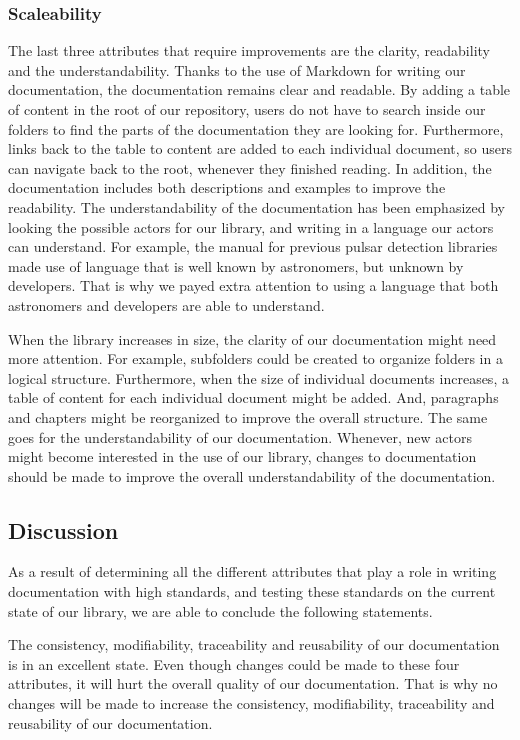 \documentclass{article}
\begin{document}
    \subsubsection{Scaleability}

    The last three attributes that require improvements are the clarity, readability and the understandability. Thanks to the use of Markdown for writing our documentation, the
    documentation remains clear and readable. By adding a table of content in the root of our repository, users do not have to search inside our folders to find the parts of the
    documentation they are looking for. Furthermore, links back to the table to content are added to each individual document, so users can navigate back to the root, whenever they
    finished reading. In addition, the documentation includes both descriptions and examples to improve the readability. The understandability of the documentation has been emphasized
    by looking the possible actors for our library, and writing in a language our actors can understand. For example, the manual for previous pulsar detection libraries made use
    of language that is well known by astronomers, but unknown by developers. That is why we payed extra attention to using a language that both astronomers and developers are able
    to understand.

    When the library increases in size, the clarity of our documentation might need more attention. For example, subfolders could be created to organize folders in a logical structure.
    Furthermore, when the size of individual documents increases, a table of content for each individual document might be added. And, paragraphs and chapters might be
    reorganized to improve the overall structure. The same goes for the understandability of our documentation. Whenever, new actors might become interested in the use of our
    library, changes to documentation should be made to improve the overall understandability of the documentation.

\subsection{Discussion}

    As a result of determining all the different attributes that play a role in writing documentation with high standards, and testing these standards on the current state of our library,
    we are able to conclude the following statements.

    The consistency, modifiability, traceability and reusability of our documentation is in an excellent state. Even though changes could be made to these four attributes, it will 
    hurt the overall quality of our documentation. That is why no changes will be made to increase the consistency, modifiability, traceability and reusability of our documentation.
\end{document}
